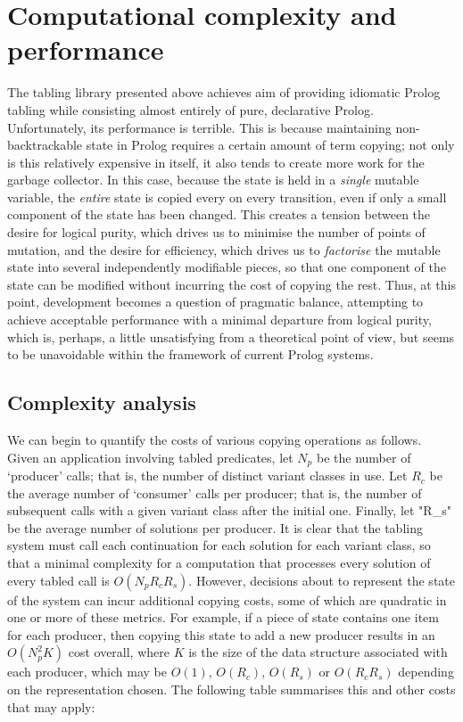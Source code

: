 \section{Computational complexity and performance}

The tabling library presented above achieves aim of providing
idiomatic Prolog tabling while consisting almost entirely of pure, declarative Prolog.
Unfortunately, its performance is terrible. This is because maintaining non-backtrackable
state in Prolog requires a certain amount of term copying; not only is this relatively
expensive in itself, it also tends to create more work for the garbage collector. In this case,
because the state is held in a \emph{single} mutable variable, the \emph{entire} state is
copied every on every transition, even if only a small component of the
state has been changed. This creates a tension between the desire for logical purity,
which drives us to minimise the number of points of mutation, and the desire for
efficiency, which drives us to \emph{factorise} the mutable state into several
independently modifiable pieces, so that one component of the state can be modified without
incurring the cost of copying the rest. Thus, at this point, development becomes a 
question of pragmatic balance, attempting to achieve acceptable performance with
a minimal departure from logical purity, which is, perhaps, a little unsatisfying from a 
theoretical point of view, but seems to be unavoidable within the framework
of current Prolog systems. 

\subsection{Complexity analysis}
We can begin to quantify the costs of various copying operations as follows.
Given an application involving tabled predicates, let $N_p$ be the number
of `producer' calls; that is, the number of distinct variant classes in use.
Let $R_c$ be the average number of `consumer' calls per producer; that is, the
number of subsequent calls with a given variant class after the initial
one. Finally, let "R_s" be the average number of solutions per producer.
It is clear that the tabling system must call each continuation for each solution
for each variant class, so that a minimal complexity for a computation that
processes every solution of every tabled call is $O(N_p R_c R_s)$. However,
decisions about to represent the state of the system can incur additional copying costs,
some of which are quadratic in one or more of these metrics. For example, if a piece of
state contains one item for each producer, then copying this state to add a new
producer results in an $O(N_p^2 K)$ cost overall, where $K$ is the size
of the data structure associated with each producer, which may be $O(1)$, $O(R_c)$,
$O(R_s)$ or $O(R_c R_s)$ depending on the representation chosen.
The following table summarises this and other costs that may apply:

